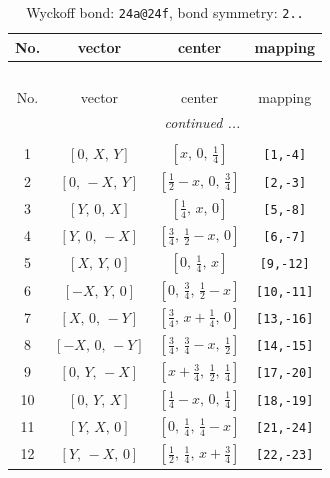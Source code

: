 \documentclass[fleqn,8pt]{jsarticle}
\begin{document}
\begin{longtable}{cccc}
\caption{Wyckoff bond: {\tt 24a@24f}, bond symmetry: {\tt 2..}}
 \\
 \hline \hline
No. & vector & center & mapping \\ \hline \endfirsthead

\multicolumn{3}{l}{\tablename\ \thetable{}} \\
 \hline \hline
No. & vector & center & mapping \\ \hline \endhead

 \hline \hline
\multicolumn{3}{r}{\footnotesize\it continued ...} \\ \endfoot

 \hline \hline
\multicolumn{3}{r}{} \\ \endlastfoot

1 & $\left[ 0,\, X,\, Y \right]$ & $\left[ x,\, 0,\, \frac{1}{4} \right]$ & {\tt [1,-4]} \\ \hline
2 & $\left[ 0,\, - X,\, Y \right]$ & $\left[ \frac{1}{2} - x,\, 0,\, \frac{3}{4} \right]$ & {\tt [2,-3]} \\ \hline
3 & $\left[ Y,\, 0,\, X \right]$ & $\left[ \frac{1}{4},\, x,\, 0 \right]$ & {\tt [5,-8]} \\ \hline
4 & $\left[ Y,\, 0,\, - X \right]$ & $\left[ \frac{3}{4},\, \frac{1}{2} - x,\, 0 \right]$ & {\tt [6,-7]} \\ \hline
5 & $\left[ X,\, Y,\, 0 \right]$ & $\left[ 0,\, \frac{1}{4},\, x \right]$ & {\tt [9,-12]} \\ \hline
6 & $\left[ - X,\, Y,\, 0 \right]$ & $\left[ 0,\, \frac{3}{4},\, \frac{1}{2} - x \right]$ & {\tt [10,-11]} \\ \hline
7 & $\left[ X,\, 0,\, - Y \right]$ & $\left[ \frac{3}{4},\, x + \frac{1}{4},\, 0 \right]$ & {\tt [13,-16]} \\ \hline
8 & $\left[ - X,\, 0,\, - Y \right]$ & $\left[ \frac{3}{4},\, \frac{3}{4} - x,\, \frac{1}{2} \right]$ & {\tt [14,-15]} \\ \hline
9 & $\left[ 0,\, Y,\, - X \right]$ & $\left[ x + \frac{3}{4},\, \frac{1}{2},\, \frac{1}{4} \right]$ & {\tt [17,-20]} \\ \hline
10 & $\left[ 0,\, Y,\, X \right]$ & $\left[ \frac{1}{4} - x,\, 0,\, \frac{1}{4} \right]$ & {\tt [18,-19]} \\ \hline
11 & $\left[ Y,\, X,\, 0 \right]$ & $\left[ 0,\, \frac{1}{4},\, \frac{1}{4} - x \right]$ & {\tt [21,-24]} \\ \hline
12 & $\left[ Y,\, - X,\, 0 \right]$ & $\left[ \frac{1}{2},\, \frac{1}{4},\, x + \frac{3}{4} \right]$ & {\tt [22,-23]} \\
\end{longtable}
\end{document}
